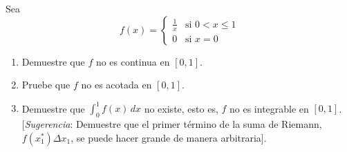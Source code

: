 \item Sea
$$f(x) = \begin{cases} 
\frac{1}{x} & \text{si } 0 < x \le 1 \\ 
0 & \text{si } x = 0 
\end{cases}$$
\begin{enumerate}
    \item[(a)] Demuestre que $f$ no es continua en $[0, 1]$.
    \item[(b)] Pruebe que $f$ no es acotada en $[0, 1]$.
    \item[(c)] Demuestre que $\int_0^1 f(x) \, dx$ no existe, esto es, $f$ no es integrable en $[0, 1]$. [\textit{Sugerencia}: Demuestre que el primer término de la suma de Riemann, $f(x_1^*) \Delta x_1$, se puede hacer grande de manera arbitraria].
\end{enumerate}
